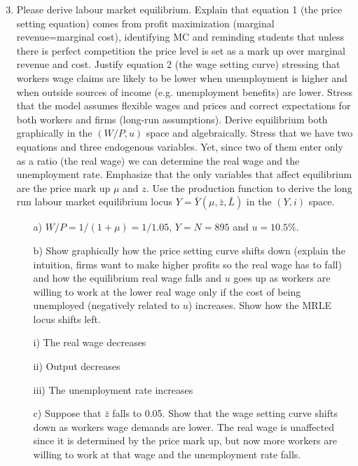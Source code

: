 \documentclass[12pt,a4paper]{article}
\begin{document}
\begin{enumerate}
\setcounter{enumi}{2}
\item Please derive labour market equilibrium. Explain that equation 1
  (the price setting equation) comes from profit maximization (marginal
  revenue=marginal cost), identifying MC and reminding students that
  unless there is perfect competition the price level is set as a mark
  up over marginal revenue and cost. Justify equation 2 (the wage
  setting curve) stressing that workers wage claims are likely to be
  lower when unemployment is higher and when outside sources of income
  (e.g. unemployment benefits) are lower. Stress that the model assumes
  flexible wages and prices and correct expectations for both workers
  and firms (long-run assumptions). Derive equilibrium both graphically
  in the $\left( W/P,u\right) $ space and algebraically.  Stress that we
  have two equations and three endogenous variables.  Yet, since two of
  them enter only as a ratio (the real wage) we can determine the real
  wage and the unemployment rate. Emphasize that the only variables that
  affect equilibrium are the price mark up $\mu$ and $z.$ Use the
  production function to derive the long run labour market equilibrium
  locus $Y=\bar Y\left( \mu,\bar{z},\bar L\right) $ in the $\left(
    Y,i\right) $ space.

  \begin{enumerate}
  \item [a)]$W/P=1/(1+\mu)=1/1.05$, $Y=N=895$ and $u=10.5\%$.

  \item[b)] Show graphically how the price setting curve shifts down
    (explain the intuition, firms want to make higher profits so the
    real wage has to fall) and how the equilibrium real wage falls and
    $u$ goes up as workers are willing to work at the lower real wage
    only if the cost of being unemployed (negatively related to $u$)
    increases. Show how the MRLE locus shifts left.

    i) The real wage decreases

    ii) Output decreases

    iii) The unemployment rate increases

  \item[c)] Suppose that $\bar{z}$ falls to 0.05. Show that the wage
    setting curve shifts down as workers wage demands are lower. The
    real wage is unaffected since it is determined by the price mark
    up, but now more workers are willing to work at that wage and the
    unemployment rate falls.


\end{enumerate}
\end{enumerate}
\end{document}
